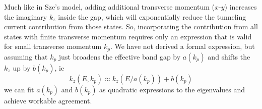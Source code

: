 Much like in Sze's model, adding additional transverse momentum ($x$-$y$) increases the imaginary $k_z$ inside the gap, which will exponentially reduce the tunneling current contribution from those states.  So, incorporating the contribution from all states with finite transverse momentum requires only an expression that is valid for small transverse momentum $k_p$.  We have not derived a formal expression, but assuming that $k_p$ just broadens the effective band gap by $a(k_p)$ and shifts the $k_z$ up by $b(k_p)$, ie
$$k_z(E,k_p)\approx k_z(E/a(k_p))+b(k_p)$$
we can fit $a(k_p)$ and $b(k_p)$ as quadratic expressions to the eigenvalues and achieve workable agreement.


